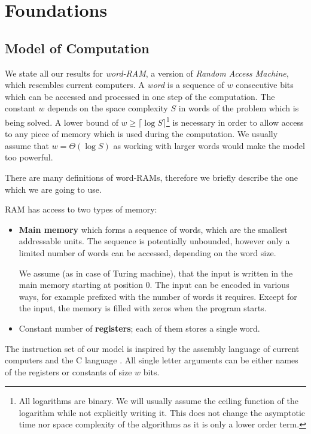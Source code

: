 \chapter{Foundations}

\section{Model of Computation}

We state all our results for \emph{word-RAM}, a version of \emph{Random Access Machine}, which resembles current computers.
A \emph{word} is a sequence of $w$ consecutive bits which can be accessed and processed in one step of the computation.
The constant $w$ depends on the space complexity $S$ in words of the problem which is being solved.
A lower bound of $w \ge \lceil \log S \rceil$\footnote{
	All logarithms are binary. 
	We will usually assume the ceiling function of the logarithm while not explicitly writing it.
	This does not change the asymptotic time nor space complexity of the algorithms as it is only a lower order term.
}
 is necessary in order to allow access to any piece of memory which is used during the computation.
We usually assume that $w = \Theta(\log S)$ as working with larger words would make the model too powerful.

\bigbreak

There are many definitions of word-RAMs, therefore we briefly describe the one which we are going to use.

RAM has access to two types of memory:
\begin{itemize}
	\item \textbf{Main memory} which forms a sequence of words, which are the smallest addressable units.
	The sequence is potentially unbounded, however only a limited number of words can be accessed, depending on the word size.
	
	We assume (as in case of Turing machine), that the input is written in the main memory starting at position $0$.
	The input can be encoded in various ways, for example prefixed with the number of words it requires.
	Except for the input, the memory is filled with zeros when the program starts.
	
	\item Constant number of \textbf{registers}; each of them stores a single word.
\end{itemize}

The instruction set of our model is inspired by the assembly language of current computers and the C language \cite{kernighan2006c}.
All single letter arguments can be either names of the registers or constants of size $w$ bits.

